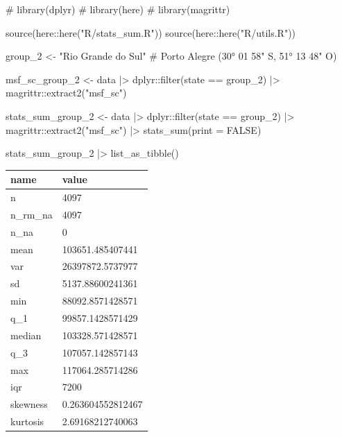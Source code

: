 \documentclass[
  12pt,
  a4paper,
  oneside]{tesesusp}
\newenvironment{Shaded}{\begin{snugshade}}{\end{snugshade}}
\newcommand{\AttributeTok}[1]{\textcolor[rgb]{0.40,0.45,0.13}{#1}}
\newcommand{\CommentTok}[1]{\textcolor[rgb]{0.37,0.37,0.37}{#1}}
\newcommand{\ConstantTok}[1]{\textcolor[rgb]{0.56,0.35,0.01}{#1}}
\newcommand{\FunctionTok}[1]{\textcolor[rgb]{0.28,0.35,0.67}{#1}}
\newcommand{\NormalTok}[1]{\textcolor[rgb]{0.00,0.23,0.31}{#1}}
\newcommand{\OtherTok}[1]{\textcolor[rgb]{0.00,0.23,0.31}{#1}}
\newcommand{\SpecialCharTok}[1]{\textcolor[rgb]{0.37,0.37,0.37}{#1}}
\newcommand{\StringTok}[1]{\textcolor[rgb]{0.13,0.47,0.30}{#1}}
\begin{document}
\begin{Shaded}
\begin{Highlighting}[numbers=left,,]
\CommentTok{\# library(dplyr)}
\CommentTok{\# library(here)}
\CommentTok{\# library(magrittr)}

\FunctionTok{source}\NormalTok{(here}\SpecialCharTok{::}\FunctionTok{here}\NormalTok{(}\StringTok{"R/stats\_sum.R"}\NormalTok{))}
\FunctionTok{source}\NormalTok{(here}\SpecialCharTok{::}\FunctionTok{here}\NormalTok{(}\StringTok{"R/utils.R"}\NormalTok{))}

\NormalTok{group\_2 }\OtherTok{\textless{}{-}} \StringTok{"Rio Grande do Sul"} \CommentTok{\# Porto Alegre (30° 01\textquotesingle{} 58" S, 51° 13\textquotesingle{} 48" O)}

\NormalTok{msf\_sc\_group\_2 }\OtherTok{\textless{}{-}}\NormalTok{ data }\SpecialCharTok{|\textgreater{}}
\NormalTok{  dplyr}\SpecialCharTok{::}\FunctionTok{filter}\NormalTok{(state }\SpecialCharTok{==}\NormalTok{ group\_2) }\SpecialCharTok{|\textgreater{}}
\NormalTok{  magrittr}\SpecialCharTok{::}\FunctionTok{extract2}\NormalTok{(}\StringTok{"msf\_sc"}\NormalTok{)}

\NormalTok{stats\_sum\_group\_2 }\OtherTok{\textless{}{-}} 
\NormalTok{  data }\SpecialCharTok{|\textgreater{}} 
\NormalTok{  dplyr}\SpecialCharTok{::}\FunctionTok{filter}\NormalTok{(state }\SpecialCharTok{==}\NormalTok{ group\_2) }\SpecialCharTok{|\textgreater{}}
\NormalTok{  magrittr}\SpecialCharTok{::}\FunctionTok{extract2}\NormalTok{(}\StringTok{"msf\_sc"}\NormalTok{) }\SpecialCharTok{|\textgreater{}} 
  \FunctionTok{stats\_sum}\NormalTok{(}\AttributeTok{print =} \ConstantTok{FALSE}\NormalTok{)}

\NormalTok{stats\_sum\_group\_2 }\SpecialCharTok{|\textgreater{}} \FunctionTok{list\_as\_tibble}\NormalTok{()}
\end{Highlighting}
\end{Shaded}

\begin{table}
\centering
\begin{tabular}{l|l}
\hline
name & value\\
\hline
n & 4097\\
\hline
n\_rm\_na & 4097\\
\hline
n\_na & 0\\
\hline
mean & 103651.485407441\\
\hline
var & 26397872.5737977\\
\hline
sd & 5137.88600241361\\
\hline
min & 88092.8571428571\\
\hline
q\_1 & 99857.1428571429\\
\hline
median & 103328.571428571\\
\hline
q\_3 & 107057.142857143\\
\hline
max & 117064.285714286\\
\hline
iqr & 7200\\
\hline
skewness & 0.263604552812467\\
\hline
kurtosis & 2.69168212740063\\
\hline
\end{tabular}
\end{table}
\end{document}
